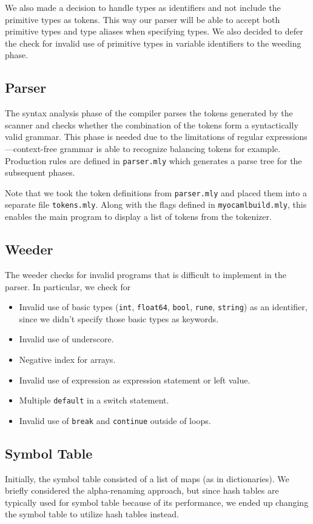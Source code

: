 \documentclass{article}
\begin{document}
We also made a decision to handle types as identifiers and not include the primitive types as tokens. This way our parser will be able to accept both primitive types and type aliases when specifying types. We also decided to defer the check for invalid use of primitive types in variable identifiers to the weeding phase.

\subsection{Parser}
The syntax analysis phase of the compiler parses the tokens generated by the scanner and checks whether the combination of the tokens form a syntactically valid grammar. This phase is needed due to the limitations of regular expressions---context-free grammar is able to recognize balancing tokens for example. Production rules are defined in \verb|parser.mly| which generates a parse tree for the subsequent phases.

Note that we took the token definitions from \verb|parser.mly| and placed them into a separate file \verb|tokens.mly|. Along with the flags defined in \verb|myocamlbuild.mly|, this enables the main program to display a list of tokens from the tokenizer.

\subsection{Weeder}
The weeder checks for invalid programs that is difficult to implement in the parser. In particular, we check for
\begin{itemize}
  \item Invalid use of basic types (\verb|int|, \verb|float64|, \verb|bool|, \verb|rune|, \verb|string|) as an identifier, since we didn't specify those basic types as keywords.
  \item Invalid use of underscore.
  \item Negative index for arrays.
  \item Invalid use of expression as expression statement or left value.
  \item Multiple \verb|default| in a switch statement.
  \item Invalid use of \verb|break| and \verb|continue| outside of loops.
\end{itemize}

\subsection{Symbol Table}
Initially, the symbol table consisted of a list of maps (as in dictionaries). We briefly considered the alpha-renaming approach, but since hash tables are typically used for symbol table because of its performance, we ended up changing the symbol table to utilize hash tables instead.
\end{document}
